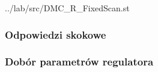 \lstset{style=customc}
\ifdefined\CompileListings
    
        {../lab/src/DMC_R_FixedScan.st}
    \newpage
\fi

\subsubsection{Odpowiedzi skokowe}


\subsubsection{Dobór parametrów regulatora}




\newpage
